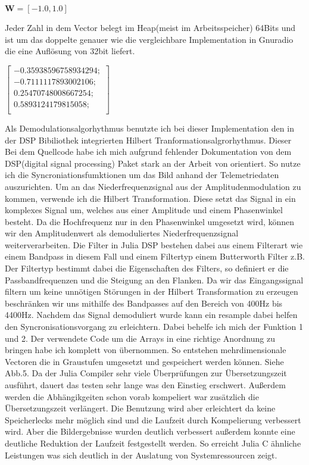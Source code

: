 \begin{multicols*}{2}
    \begin{math}
        \mathbf{W} =[-1.0, 1.0]
    \end{math}

    Jeder Zahl in dem Vector belegt im Heap(meist im Arbeitsspeicher) 64Bits und ist um das doppelte genauer wie die vergleichbare Implementation in Gnuradio die eine Auflösung von 32bit liefert. 

    \begin{math}
        \begin{bmatrix}
            -0.35938596758934294;\\
            -0.7111117893002106;\\
            0.25470748008667254;\\
            0.5893124179815058;\\
        \end{bmatrix}
    \end{math}

    Als Demodulationsalgorhythmus benutzte ich bei dieser Implementation den in der DSP Bibiliothek integrierten Hilbert Tranformationsalgrorhythmus. Dieser 
    Bei dem Quellcode habe ich mich aufgrund fehlender Dokumentation von dem DSP(digital signal processing) Paket stark an der Arbeit von \cite[]{APTDecoder.jl}orientiert. So nutze ich die Syncroniationsfumktionen um das Bild anhand der Telemetriedaten auszurichten. 
    Um an das Niederfrequenzsignal aus der Amplitudenmodulation zu kommen, verwende ich die Hilbert Transformation. Diese setzt das Signal in ein komplexes Signal um, welches aus einer Amplitude und einem Phasenwinkel besteht. Da die Hochfrequenz nur in den Phasenwinkel umgesetzt wird, können wir den Amplitudenwert als demoduliertes Niederfrequenzsignal weiterverarbeiten. Die Filter in Julia DSP bestehen dabei aus einem Filterart wie einem Bandpass in diesem Fall und einem Filtertyp einem Butterworth Filter z.B. Der Filtertyp bestimmt dabei die Eigenschaften des Filters, so definiert er die Passbandfrequenzen und die Steigung an den Flanken. Da wir das Eingangssignal filtern um keine unnötigen Störungen in der Hilbert Transformation zu erzeugen beschränken wir uns mithilfe des Bandpasses auf den Bereich von 400Hz bis 4400Hz. Nachdem das Signal demoduliert wurde kann ein resample dabei helfen den Syncronisationsvorgang zu erleichtern. Dabei behelfe ich mich der Funktion 1 und 2. Der verwendete Code um die Arrays in eine richtige Anordnung zu bringen habe ich komplett von \cite[]{APTDecoder.jl} übernommen. So entstehen mehrdimensionale Vectoren die in Graustufen umgesetzt und gespeichert werden können. Siehe Abb.5.
    Da der Julia Compiler sehr viele Überprüfungen zur Übersetzungszeit ausführt, dauert das testen sehr lange was den Einstieg erschwert. Außerdem werden die Abhängikgeiten schon vorab kompeliert war zusätzlich die Übersetzungszeit verlängert. Die Benutzung wird aber erleichtert da keine Speicherlecks mehr möglich sind und die Laufzeit durch Kompelierung verbessert wird. Aber die Bildergebnisse wurden deutlich verbessert außerdem konnte eine deutliche Reduktion der Laufzeit festgestellt werden. So erreicht Julia C ähnliche Leistungen was sich deutlich in der Auslatung von Systemressourcen zeigt. 
\end{multicols*}
    
